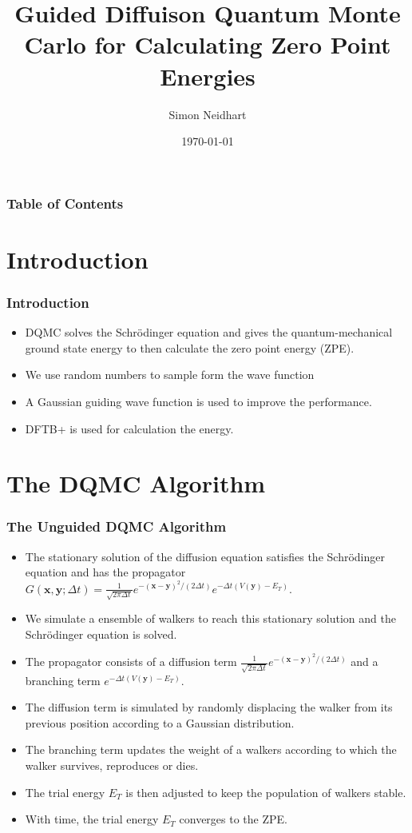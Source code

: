 \documentclass{beamer}
\title{Guided Diffuison Quantum Monte Carlo for Calculating Zero Point Energies}
\author{Simon Neidhart}
\institute{Department of Physics, University of Basel}
\date{\today}
\begin{document}
\frame{\titlepage}

\begin{frame}
\frametitle{Table of Contents}
\tableofcontents
\end{frame}

\section{Introduction}
\begin{frame}
\frametitle{Introduction}
\begin{itemize}
\item DQMC solves the Schrödinger equation and gives the quantum-mechanical ground state energy to then calculate the zero point energy (ZPE).
\item We use random numbers to sample form the wave function
\item A Gaussian guiding wave function is used to improve the performance.
\item DFTB+ is used for calculation the energy.
\end{itemize}
\end{frame}

\section{The DQMC Algorithm}
\begin{frame}
\frametitle{The Unguided DQMC Algorithm}
\begin{itemize}
\item The stationary solution of the diffusion equation satisfies the Schrödinger equation and has the propagator $G(\bm{x},\bm{y};\Delta t) = \frac{1}{\sqrt{2 \pi \Delta t}} e^{-(\bm{x}-\bm{y})^2/(2\Delta t)} e^{-\Delta t (V(\bm{y}) - E_T)}$.
\item We simulate a ensemble of walkers to reach this stationary solution and the Schrödinger equation is solved.
\item The propagator consists of a diffusion term $\frac{1}{\sqrt{2 \pi \Delta t}} e^{-(\bm{x}-\bm{y})^2/(2\Delta t)}$ and a branching term $e^{-\Delta t (V(\bm{y}) - E_T)}$.
\item The diffusion term is simulated by randomly displacing the walker from its previous position according to a Gaussian distribution.
\item The branching term updates the weight of a walkers according to which the walker survives, reproduces or dies.
\item The trial energy $E_T$ is then adjusted to keep the population of walkers stable.
\item With time, the trial energy $E_T$ converges to the ZPE.
\end{itemize}
\end{frame}
\end{document}
